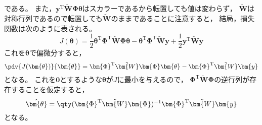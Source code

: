 \documentclass[class=jsarticle, crop=false, dvipdfmx, fleqn]{standalone}
\begin{document}
である。
また，\(\bm{y}^\mathrm{T}\tilde{\bm{W}}\bm{\Phi}\bm{\theta}\)はスカラーであるから転置しても値は変わらず，
\(\tilde{\bm{W}}\)は対称行列であるので転置しても\(\tilde{\bm{W}}\)のままであることに注意すると，
結局，損失関数は次のように表される。
\begin{equation}
	J(\bm{\theta}) = \frac{1}{2} \bm{\theta}^\mathrm{T} \bm{\Phi}^\mathrm{T}\tilde{\bm{W}}\bm{\Phi}\bm{\theta} - \bm{\theta}^\mathrm{T} \bm{\Phi}^\mathrm{T} \tilde{\bm{W}}\bm{y} + \frac{1}{2} \bm{y}^\mathrm{T} \tilde{\bm{W}} \bm{y}
\end{equation}
これを\(\bm{\theta}\)で偏微分すると，
\begin{equation}
	\pdv{J(\bm{\theta})}{\bm{\theta}} = \bm{\Phi}^\mathrm{T}\tilde{\bm{W}}\bm{\Phi}\bm{\theta} - \bm{\Phi}^\mathrm{T} \tilde{\bm{W}}\bm{y}
\end{equation}
となる。
これを\(\bm{0}\)とするような\(\bm{\theta}\)が\(J\)に最小を与えるので，
\(\bm{\Phi}^\mathrm{T}\tilde{\bm{W}}\bm{\Phi}\)の逆行列が存在することを仮定すると，
\begin{equation}
	\hat{\bm{\theta}} = \qty(\bm{\Phi}^\mathrm{T}\tilde{\bm{W}}\bm{\Phi})^{-1} \bm{\Phi}^\mathrm{T} \tilde{\bm{W}}\bm{y}
\end{equation}
となる。
\end{document}

